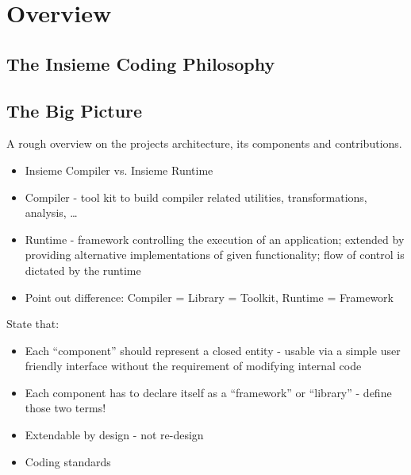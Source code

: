 \chapter{Overview} \label{cap:overview}

\section{The Insieme Coding Philosophy}

\section{The Big Picture}
A rough overview on the projects architecture, its components and contributions.

\begin{itemize}
  \item Insieme Compiler vs. Insieme Runtime
  \item Compiler - tool kit to build compiler related utilities,
  transformations, analysis, \ldots
  \item Runtime - framework controlling the execution of an application;
  extended by providing alternative implementations of given functionality; flow
  of control is dictated by the runtime
  \item Point out difference: Compiler = Library = Toolkit, Runtime = Framework
\end{itemize}


State that:
\begin{itemize}
  \item Each ``component'' should represent a closed entity - usable via a simple
  user friendly interface without the requirement of modifying internal code
  \item Each component has to declare itself as a ``framework'' or ``library'' -
  define those two terms!
  \item Extendable by design - not re-design
  \item Coding standards
\end{itemize}